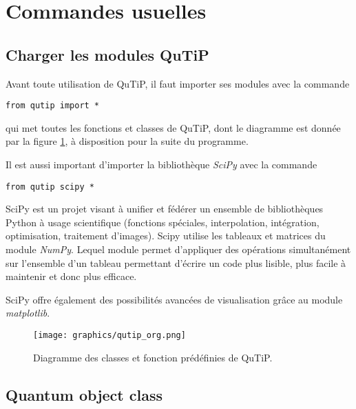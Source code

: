 \section{Commandes usuelles}

\subsection{Charger les modules QuTiP}

Avant toute utilisation de QuTiP, il faut importer ses modules avec la commande
\begin{lstlisting}
from qutip import *
\end{lstlisting}
qui met toutes les fonctions et classes de QuTiP, dont le diagramme est donnée 
par la figure \ref{fig:qutip_org}, à disposition pour la suite du programme.

Il est aussi important d'importer la bibliothèque \emph{SciPy} avec la commande
\begin{lstlisting}
from qutip scipy *
\end{lstlisting}
SciPy est un projet visant à unifier et fédérer un ensemble de bibliothèques 
Python à usage scientifique (fonctions spéciales, interpolation, intégration, 
optimisation, traitement d'images). Scipy utilise les tableaux et matrices du 
module \emph{NumPy}. Lequel module permet d'appliquer des opérations 
simultanément sur l'ensemble d'un tableau permettant d'écrire un code plus 
lisible, plus facile à maintenir et donc plus efficace.

SciPy offre également des possibilités avancées de visualisation grâce au 
module \emph{matplotlib}.

\begin{figure}[htbp]
 \centering
 \texttt{[image: graphics/qutip\_org.png]}
 \caption{Diagramme des classes et fonction prédéfinies de QuTiP.}
 \label{fig:qutip_org}
\end{figure}

\subsection{Quantum object class}

